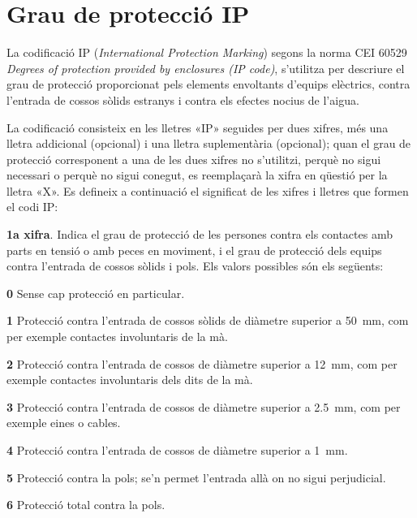 \section{Grau de protecció IP} \label{sec:grau-IP}  

La codificació IP (\textit{International Protection Marking})  segons la
norma CEI 60529 \textit{Degrees of protection provided by enclosures (IP code)}, s'utilitza per descriure el grau de
protecció  proporcionat pels elements envoltants d'equips elèctrics, contra
l'entrada de cossos sòlids estranys i contra els efectes nocius
de l'aigua.

La codificació consisteix en les lletres «IP»
seguides per dues xifres, més una lletra addicional (opcional) i una
lletra suplementària (opcional); quan el grau de protecció
corresponent a una de les dues xifres no s'utilitzi, perquè no sigui
necessari o perquè no sigui conegut, es reemplaçarà la xifra en
qüestió per la lletra «X». Es defineix a continuació el
significat de les xifres i lletres que formen el codi IP:

\textbf{1a xifra}. Indica el grau de protecció de les persones contra els contactes amb
parts en tensió o amb peces en moviment, i el grau de protecció dels equips contra l'entrada de cossos sòlids i pols. Els valors possibles són els següents:
\begin{list}{}
   {\setlength{\labelwidth}{10mm} \setlength{\leftmargin}{10mm} \setlength{\labelsep}{2mm}}
   \item[\textbf{0}] Sense cap protecció en particular.
   \item[\textbf{1}] Protecció contra l'entrada de cossos sòlids de diàmetre superior a \qty{50}{mm},
   com per exemple   contactes involuntaris de la mà.
   \item[\textbf{2}] Protecció contra l'entrada de cossos de diàmetre superior a \qty{12}{mm}, com per exemple
   contactes involuntaris dels dits de la mà.
   \item[\textbf{3}] Protecció contra l'entrada de cossos de diàmetre superior a \qty{2,5}{mm},
   com per exemple eines o cables.
   \item[\textbf{4}] Protecció contra l'entrada de cossos de diàmetre superior a \qty{1}{mm}.
   \item[\textbf{5}] Protecció contra la pols; se'n permet l'entrada allà on no sigui perjudicial.
   \item[\textbf{6}] Protecció total contra la pols.
\end{list}

